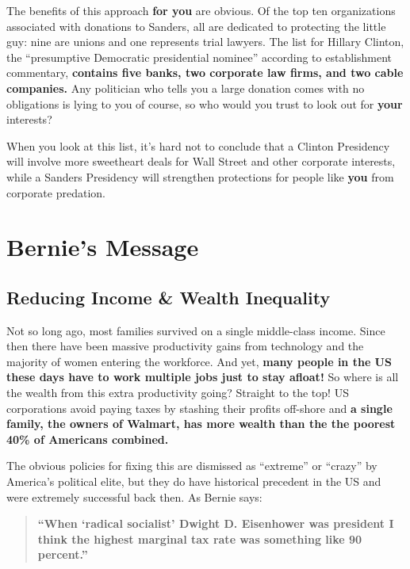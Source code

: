 \documentclass[notumble]{leaflet}
\begin{document}
The benefits of this approach {\bf for you} are obvious.  Of the top
ten organizations associated with donations to Sanders, all are
dedicated to protecting the little guy: nine are unions and one
represents trial lawyers.  The list for Hillary Clinton, the
``presumptive Democratic presidential nominee'' according to
establishment commentary, {\bf contains five banks, two corporate law
  firms, and two cable companies.}  Any politician who tells you a
large donation comes with no obligations is lying to you of course, so
who would you trust to look out for {\bf your} interests?

When you look at this list, it's hard not to conclude that a Clinton
Presidency will involve more sweetheart deals for Wall Street and
other corporate interests, while a Sanders Presidency will strengthen
protections for people like {\bf you} from corporate predation.

\section*{Bernie's Message}

\subsection*{Reducing Income \& Wealth Inequality}

Not so long ago, most families survived on a single middle-class
income.  Since then there have been massive productivity gains from
technology and the majority of women entering the workforce.  And yet,
{\bf many people in the US these days have to work multiple jobs just
  to stay afloat!}  So where is all the wealth from this extra
productivity going?  Straight to the top!  US corporations avoid
paying taxes by stashing their profits off-shore and {\bf a single
  family, the owners of Walmart, has more wealth than the the poorest
  40\% of Americans combined.}

The obvious policies for fixing this are dismissed as ``extreme'' or
``crazy'' by America's political elite, but they do have historical
precedent in the US and were extremely successful back then.  As
Bernie says:

\begin{quote}
{\bf\large ``When `radical socialist' Dwight D. Eisenhower was president
  I think the highest marginal tax rate was something like 90
  percent.''}
\end{quote} 
\end{document}

